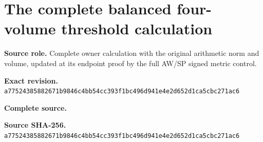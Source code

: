 \begingroup
\sloppy
\small
\section{The complete balanced four-volume threshold calculation}
\noindent\textbf{Source role.} Complete owner calculation with the original arithmetic norm and volume, updated at its endpoint proof by the full AW/SP signed metric control.\par
\noindent\textbf{Exact revision.} \nolinkurl{a77524385882671b9846c4bb54cc393f1bc496d941e4e2d652d1ca5cbc271ac6}\par
\noindent\textbf{Complete source.} \par
\noindent\textbf{Source SHA-256.} \nolinkurl{a77524385882671b9846c4bb54cc393f1bc496d941e4e2d652d1ca5cbc271ac6}\par\medskip

\endgroup
